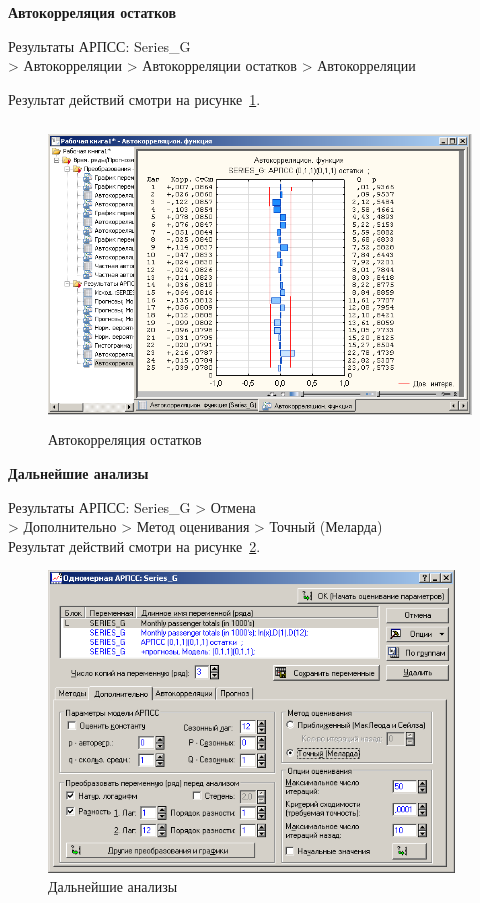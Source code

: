 \newpage

\begin{center}
  \textbf{Автокорреляция остатков}
\end{center}

Результаты АРПСС: Series\_G\\
> Автокорреляции
> Автокорреляции остатков
> Автокорреляции

Результат действий смотри на рисунке~\ref{fig:20}.

\begin{figure}[!h]
  \centering

  \includegraphics[height=8cm]
  {inc/20.PNG}

  \caption{Автокорреляция остатков}

  \label{fig:20}
\end{figure}

\begin{center}
  \textbf{Дальнейшие анализы}
\end{center}

Результаты АРПСС: Series\_G > Отмена\\
> Дополнительно > Метод оценивания > Точный (Меларда)\\

Результат действий смотри на рисунке~\ref{fig:21}.

\begin{figure}[!h]
  \centering

  \includegraphics[height=8cm]
  {inc/21.PNG}

  \caption{Дальнейшие анализы}

  \label{fig:21}
\end{figure}


